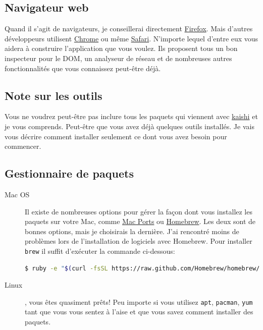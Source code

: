 \documentclass[]{report}
\begin{document}
    \subsection{Navigateur web}

      Quand il s'agit de navigateurs, je conseillerai directement \href{http://www.mozilla.org/en-US/firefox/new/}{Firefox}. Mais d'autres développeurs utilisent \href{https://www.google.com/intl/en/chrome/browser/}{Chrome} ou même \href{https://www.apple.com/safari/}{Safari}. N'importe lequel d'entre eux vous aidera à construire l'application que vous voulez. Ils proposent tous un bon inspecteur pour le DOM, un analyseur de réseau et de nombreuses autres fonctionnalités que vous connaissez peut-être déjà.

    \subsection{Note sur les outils}

      Vous ne voudrez peut-être pas inclure tous les paquets qui viennent avec \href{http://icalialabs.github.io/kaishi/}{kaishi} et je vous comprends. Peut-être que vous avez déjà quelques outils installés. Je vais vous décrire comment installer seulement ce dont vous avez besoin pour commencer.

    \subsection{Gestionnaire de paquets}

      \begin{description}
        \item[Mac OS] Il existe de nombreuses options pour gérer la façon dont vous installez les paquets sur votre Mac, comme \href{https://www.macports.org/}{Mac Ports} ou \href{http://brew.sh/}{Homebrew}. Les deux sont de bonnes options, mais je choisirais la dernière. J'ai rencontré moins de problèmes lors de l'installation de logiciels avec Homebrew. Pour installer \verb|brew| il suffit d'exécuter la commande ci-dessous:
        \begin{scriptsize}
          \begin{lstlisting}[language=bash]
          $ ruby -e "$(curl -fsSL https://raw.github.com/Homebrew/homebrew/go/install)"
          \end{lstlisting}
        \end{scriptsize}
        \item[Linux], vous êtes quasiment prêts! Peu importe si vous utilisez \verb|apt|, \verb|pacman|, \verb|yum| tant que vous vous sentez à l'aise et que vous savez comment installer des paquets.
      \end{description}
\end{document}
